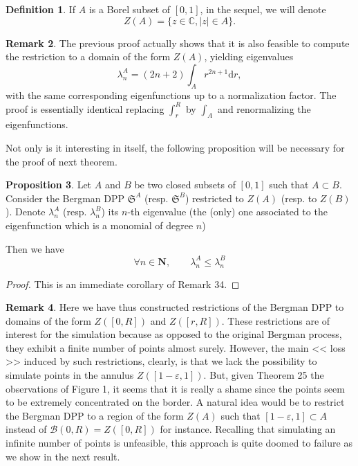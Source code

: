\documentclass[11pt]{article}
\theoremstyle{plain}
\theoremstyle{definition}
\newtheorem{definition}{Definition}
\newtheorem{proposition}[definition]{Proposition}
\newtheorem{remark}[definition]{Remark}
\begin{document}
\begin{definition} If $A$ is a Borel subset of $[0,1]$, in the sequel, we will denote 
\[
Z(A) = \{z \in \mathbb{C}, |z| \in A\}.
\]
\end{definition}

\begin{remark} The previous proof actually shows that it is also feasible to compute the restriction to a domain of the form $ Z(A) $, yielding eigenvalues
\[
\lambda_n^A = (2n+2)\int_A r^{2n+1} \mathrm dr,
\] 
with the same corresponding eigenfunctions up to a normalization factor. The proof is essentially identical replacing $ \int_r^R $ by $ \int_A $ and renormalizing the eigenfunctions.
\end{remark}

Not only is it interesting in itself, the following proposition will be necessary for the proof of next theorem.

\begin{proposition} Let $ A $ and $B$ be two closed subsets of $ [0,1] $ such that $ A \subset B $. Consider the Bergman DPP $ \mathfrak S^A $ (resp. $ \mathfrak S^B $) restricted to $Z(A)$ (resp. to $Z(B)$). Denote $ \lambda^A_n $ (resp. $ \lambda^B_n $) its $n$-th eigenvalue (the (only) one associated to the eigenfunction which is a monomial of degree $n$)

Then we have 
\[
    \forall n \in \mathbf N, \qquad \lambda_n^A \leqslant \lambda_n^B
\]
\end{proposition}

\begin{proof}

This is an immediate corollary of Remark 34.

\end{proof}

\begin{remark} 
    Here we have thus constructed restrictions of the Bergman DPP to domains of the form $ Z([0,R]) $ and $ Z([r,R]) $. These restrictions are of interest for the simulation because as opposed to the original Bergman process, they exhibit a finite number of points almost surely. However, the main << loss >> induced by such restrictions, clearly, is that we lack the possibility to simulate points in the annulus $ Z([1-\varepsilon,1]) $. But, given Theorem 25 the observations of Figure 1, it seems that it is really a shame since the points seem to be extremely concentrated on the border. A natural idea would be to restrict the Bergman DPP to a region of the form $ Z(A) $ such that $ [1-\varepsilon, 1] \subset A$ instead of $ \mathcal B(0,R) = Z([0,R]) $ for instance. Recalling that simulating an infinite number of points is unfeasible, this approach is quite doomed to failure as we show in the next result.
\end{remark}
\end{document}

